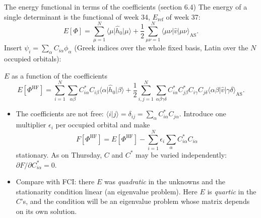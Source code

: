 \documentclass[aspectratio=169,10pt]{beamer}
\newcommand{\braket}[2]{\langle #1\vert #2\rangle}
\newcommand{\element}[3]{\langle #1\vert #2\vert #3\rangle}
\begin{document}
\begin{frame}{The energy functional in terms of the coefficients (section 6.4)}
  \footnotesize
  The energy of a single determinant is the functional of week 34, $E_{\mathrm{ref}}$ of week 37:
  \[
    E[\Phi]=\sum_{\mu=1}^{N}\element{\mu}{\hat{h}_0}{\mu}+\frac12\sum_{\mu\nu=1}^{N}\element{\mu\nu}{\hat{v}}{\mu\nu}_{\mathrm{AS}} .
  \]
  Insert $\psi_i=\sum_\alpha C_{i\alpha}\phi_\alpha$ (Greek indices over the whole fixed basis, Latin over the $N$ occupied orbitals):
  \begin{block}{$E$ as a function of the coefficients}
    \[
      E[\Phi^{\mathrm{HF}}]=\sum_{i=1}^{N}\sum_{\alpha\beta}C_{i\alpha}^{*}C_{i\beta}\element{\alpha}{\hat{h}_0}{\beta}
      +\frac12\sum_{i,j=1}^{N}\sum_{\alpha\beta\gamma\delta}C_{i\alpha}^{*}C_{j\beta}^{*}C_{i\gamma}C_{j\delta}\element{\alpha\beta}{\hat{v}}{\gamma\delta}_{\mathrm{AS}} .
    \]
  \end{block}
  \begin{itemize}
    \item The coefficients are not free: $\braket{i}{j}=\delta_{ij}=\sum_\alpha C_{i\alpha}^{*}C_{j\alpha}$. Introduce one multiplier $\epsilon_i$ per occupied orbital and make
    \[
      F[\Phi^{\mathrm{HF}}]=E[\Phi^{\mathrm{HF}}]-\sum_{i=1}^{N}\epsilon_i\sum_\alpha C_{i\alpha}^{*}C_{i\alpha}
    \]
    stationary. As on Thursday, $C$ and $C^{*}$ may be varied independently: $\partial F/\partial C_{i\alpha}^{*}=0$.
    \item Compare with FCI: there $E$ was \emph{quadratic} in the unknowns and the stationarity condition linear (an eigenvalue problem). Here $E$ is \emph{quartic} in the $C$'s, and the condition will be an eigenvalue problem whose matrix depends on its own solution.
  \end{itemize}
\end{frame}
\end{document}
